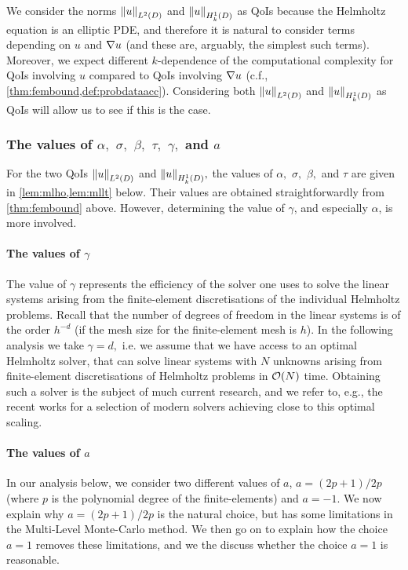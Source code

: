 We consider the norms $\NLtD{u}$ and $\NHokD{u}$ as QoIs because the Helmholtz equation is an elliptic PDE, and therefore it is natural to consider terms depending on $u$ and $\nabla u$ (and these are, arguably, the simplest such terms). Moreover, we expect different $k$-dependence of the computational complexity for QoIs involving $u$ compared to QoIs involving  $\nabla u$ (c.f., \cref{thm:fembound,def:probdataacc}). Considering both $\NLtD{u}$ and $\NHokD{u}$ as QoIs will allow us to see if this is the case.
\ere

\subsubsection{The values of $\alpha,$ $\sigma,$ $\beta,$ $\tau,$ $\gamma,$ and $a$}
For the two QoIs $\NLtD{u}$ and $\NHokD{u},$ the values of $\alpha,$ $\sigma,$ $\beta,$ and $\tau$ are given in \cref{lem:mlho,lem:mllt} below. Their values are obtained straightforwardly from \cref{thm:fembound} above. However, determining the value of $\gamma$, and especially $\alpha$, is more involved.

\paragraph{The values of $\gamma$} The value of $\gamma$ represents the efficiency of the solver one uses to solve the linear systems arising from the finite-element discretisations of the individual Helmholtz problems. Recall that the number of degrees of freedom in the linear systems is of the order $h^{-d}$ (if the mesh size for the finite-element mesh is $h$). In the following analysis we take $\gamma = d,$ i.e. we assume that we have access to an optimal Helmholtz solver, that can solve linear systems with $N$ unknowns arising from finite-element discretisations of Helmholtz problems in $\mathcal O(N)$ time. Obtaining such a solver is the subject of much current research, and we refer to, e.g., the recent works \cite{GrSpVa:17,ZeScHeDe:19,TaZeHeDe:19} for a selection of modern solvers achieving close to this optimal scaling.

\paragraph{The values of $a$} In our analysis below, we consider two different values of $a$, $a=(2p+1)/2p$ (where $p$ is the polynomial degree of the finite-elements) and $a=-1$. We now explain why $a=(2p+1)/2p$ is the natural choice, but has some limitations in the Multi-Level Monte-Carlo method. We then go on to explain how the choice $a=1$ removes these limitations, and we the discuss whether the choice $a=1$ is reasonable.

